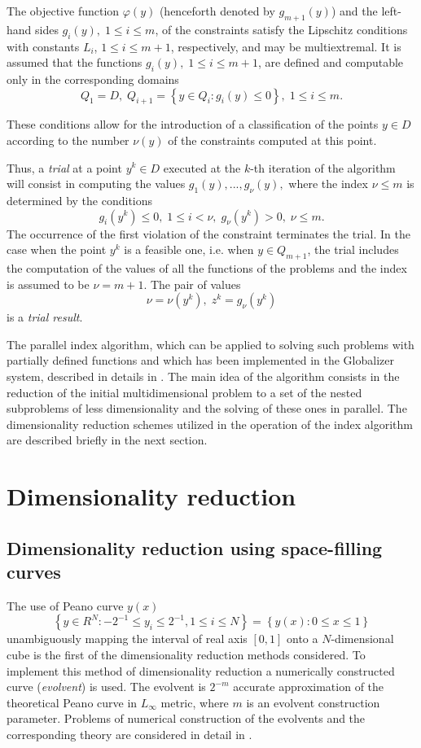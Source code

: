 \documentclass[a4paper]{jpconf}
\begin{document}
The objective function $\varphi(y)$ (henceforth denoted by $g_{m+1}(y)$) and
the left-hand sides $g_i(y), \; 1\leq i \leq m$, of the constraints
satisfy the Lipschitz conditions with constants $L_i$, $1 \leq i \leq
m+1$, respectively, and may be multiextremal. It is assumed that the
functions $g_i(y),\; 1 \leq i \leq m+1$, are defined and computable only in 
the corresponding domains
\[
Q_1=D, \; Q_{i+1}=\left\{y \in Q_i : g_i(y) \leq 0 \right\}, \; 1 \leq i \leq 
m.
\]

These conditions allow for the introduction of a classification of the
points $y \in D$ according to the number $\nu (y)$ of the constraints
computed at this point. 

Thus, a \textit{trial} at a point $y^k \in D$ executed at the $k$-th
iteration of the algorithm will consist in computing the values 
$g_1(y),...,g_\nu(y),$ where the
index $\nu \leq m$ is determined by the conditions
\[
	g_i(y^k )\leq 0, \; 1 \leq i < \nu, \; g_\nu(y^k)>0, \; \nu \leq m.
\]
The occurrence of the first violation of the constraint terminates the
trial. In the case when the point $y^k$ is a feasible one, i.e. when
$y \in Q_{m+1}$, the trial includes the computation of the values of
all the functions of the problems and the index is assumed to be
$\nu=m+1$. The pair of values
\[
\nu=\nu(y^k), \; z^k=g_\nu(y^k)
\]
is a \textit{trial result}.

The parallel index algorithm, which can be applied to solving such problems 
with partially defined functions and which has been implemented in the 
Globalizer system, described in details in \cite{Strongin2013}. The main idea of the algorithm 
consists in the reduction of the initial multidimensional problem to a set of 
the nested subproblems of less dimensionality and the solving of these ones 
in parallel. The dimensionality reduction schemes utilized in the operation 
of the index algorithm are described briefly in the next section.

\section{Dimensionality reduction}

\subsection{Dimensionality reduction using space-filling curves}

The use of Peano curve $y(x)$ 
\[
\left\{y\in R^N: -2^{-1}\leq y_i \leq 2^{-1}, 1 \leq i \leq 
N\right\}=\left\{y(x):0\leq x \leq 1 \right\}
\]
unambiguously mapping the interval of real axis $[0,1]$ onto a $N$-dimensional cube is the first of the dimensionality reduction methods considered.  To implement this method of dimensionality reduction a 
numerically constructed curve (\textit{evolvent}) is used. The evolvent is 
$2^{-m}$ accurate approximation of the theoretical Peano curve in $L_\infty$ 
metric, where $m$ is an evolvent construction parameter. Problems of 
numerical construction of the evolvents and the corresponding theory are 
considered in detail in \cite{Strongin2000}. 
\end{document}
